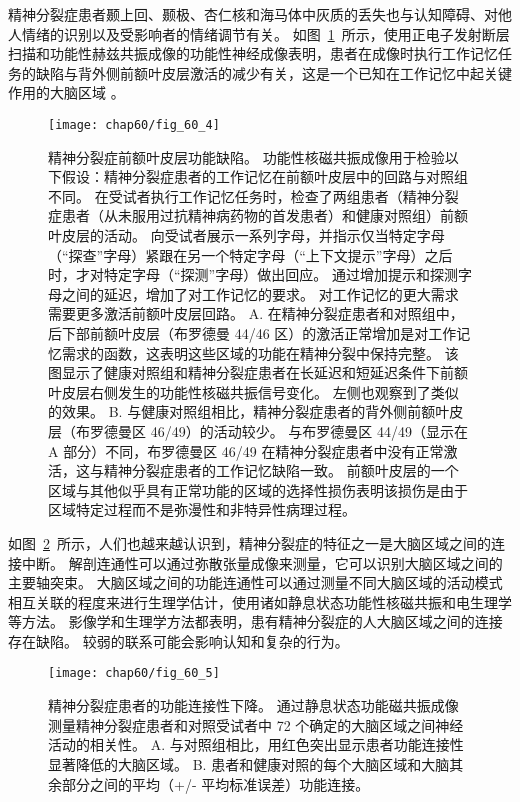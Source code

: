 精神分裂症患者颞上回、颞极、杏仁核和海马体中灰质的丢失也与认知障碍、对他人情绪的识别以及受影响者的情绪调节有关。
如图~\ref{fig:60_4}~所示，使用正电子发射断层扫描和功能性赫兹共振成像的功能性神经成像表明，患者在成像时执行工作记忆任务的缺陷与背外侧前额叶皮层激活的减少有关，这是一个已知在工作记忆中起关键作用的大脑区域 。


\begin{figure}[htbp]
	\centering
	\texttt{[image: chap60/fig\_60\_4]}
	\caption{精神分裂症前额叶皮层功能缺陷。
		功能性核磁共振成像用于检验以下假设：精神分裂症患者的工作记忆在前额叶皮层中的回路与对照组不同。
		在受试者执行工作记忆任务时，检查了两组患者（精神分裂症患者（从未服用过抗精神病药物的首发患者）和健康对照组）前额叶皮层的活动。
		向受试者展示一系列字母，并指示仅当特定字母（“探查”字母）紧跟在另一个特定字母（“上下文提示”字母）之后时，才对特定字母（“探测”字母）做出回应。
		通过增加提示和探测字母之间的延迟，增加了对工作记忆的要求。
		对工作记忆的更大需求需要更多激活前额叶皮层回路\cite{barch2001selective}。
		A. 在精神分裂症患者和对照组中，后下部前额叶皮层（布罗德曼 44/46 区）的激活正常增加是对工作记忆需求的函数，这表明这些区域的功能在精神分裂中保持完整。
		该图显示了健康对照组和精神分裂症患者在长延迟和短延迟条件下前额叶皮层右侧发生的功能性核磁共振信号变化。
		左侧也观察到了类似的效果。
		B. 与健康对照组相比，精神分裂症患者的背外侧前额叶皮层（布罗德曼区 46/49）的活动较少。
		与布罗德曼区 44/49（显示在 A 部分）不同，布罗德曼区 46/49 在精神分裂症患者中没有正常激活，这与精神分裂症患者的工作记忆缺陷一致。
		前额叶皮层的一个区域与其他似乎具有正常功能的区域的选择性损伤表明该损伤是由于区域特定过程而不是弥漫性和非特异性病理过程。}
	\label{fig:60_4}
\end{figure}


如图~\ref{fig:60_5}~所示，人们也越来越认识到，精神分裂症的特征之一是大脑区域之间的连接中断。
解剖连通性可以通过弥散张量成像来测量，它可以识别大脑区域之间的主要轴突束。
大脑区域之间的功能连通性可以通过测量不同大脑区域的活动模式相互关联的程度来进行生理学估计，使用诸如静息状态功能性核磁共振和电生理学等方法。
影像学和生理学方法都表明，患有精神分裂症的人大脑区域之间的连接存在缺陷。
较弱的联系可能会影响认知和复杂的行为。


\begin{figure}[htbp]
	\centering
	\texttt{[image: chap60/fig\_60\_5]}
	\caption{精神分裂症患者的功能连接性下降。
		通过静息状态功能磁共振成像测量精神分裂症患者和对照受试者中 72 个确定的大脑区域之间神经活动的相关性\cite{lynall2010functional}。
		A. 与对照组相比，用红色突出显示患者功能连接性显著降低的大脑区域。
		B. 患者和健康对照的每个大脑区域和大脑其余部分之间的平均（+/- 平均标准误差）功能连接。}
	\label{fig:60_5}
\end{figure}



